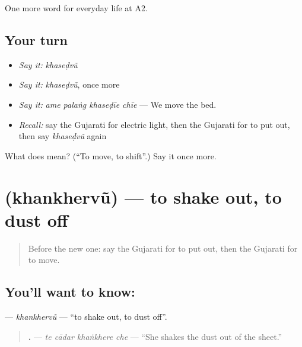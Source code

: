 \begin{grammarlens}[title={What you've built}]
One more word for everyday life at A2.
\end{grammarlens}

\subsection*{Your turn}
\begin{itemize}
\raggedright
  \item \emph{Say it:} \emph{khaseḍvũ}
  \item \emph{Say it:} \emph{khaseḍvũ}, once more
  \item \emph{Say it:} \emph{ame palaṅg khaseḍīe chīe} — We move the bed.
  \item \emph{Recall:} say the Gujarati for electric light, then the Gujarati for to put out, then say \emph{khaseḍvũ} again
\end{itemize}

\begin{tcolorbox}[breakable,colback=teal!4,colframe=teal!35!black,title={Before you move on}]
What does  mean? (\textquotedblleft{}To move, to shift\textquotedblright{}.) Say it once more.
\end{tcolorbox}
\section[\texorpdfstring{\gu{ખંખેરવું} (khankhervũ)}{ખંખેરવું (khankhervũ)}]{ (khankhervũ) — to shake out, to dust off}

\label{lesson:GU-C161-khankhervu}



\begin{quote}
Before the new one: say the Gujarati for to put out, then the Gujarati for to move.
\end{quote}

\subsection*{You'll want to know: }
\textbf{} — \emph{khankhervũ} — \textquotedblleft{}to shake out, to dust off\textquotedblright{}.

\begin{quote}
\textbf{   .} — \emph{te cādar khaṅkhere che} — \textquotedblleft{}She shakes the dust out of the sheet.\textquotedblright{}
\end{quote}

